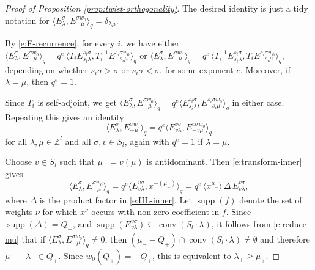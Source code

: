 \documentclass[12pt]{amsart}
\theoremstyle{definition}
\theoremstyle{remark}
\newcommand{\ZZ}{{\mathbb Z}}
\DeclareMathOperator{\conv}{conv}
\DeclareMathOperator{\supp}{supp}
\begin{document}
\begin{proof}[Proof of Proposition \ref{prop:twist-orthogonality}]
The desired identity is just a tidy notation for $\langle E_{\lambda
}^{\sigma },E_{-\mu }^{\sigma w_{0}} \rangle _{q} = \delta _{\lambda
\mu }$.

By \eqref{e:E-recurrence}, for every $i$, we have either $\langle
E_{\lambda }^{\sigma }, E_{-\mu }^{\sigma w_{0}} \rangle _{q} =
q^{e}\, \langle T_{i} E_{s_{i}\lambda }^{s_{i}\sigma },
T_{i}^{-1}E_{-s_{i} \mu }^{s_{i} \sigma w_{0}} \rangle _{q}$ or
$\langle E_{\lambda }^{\sigma }, E_{-\mu }^{\sigma w_{0}} \rangle _{q}
= q^{e}\, \langle T_{i}^{-1} E_{s_{i} \lambda }^{s_{i} \sigma }, T_{i}
E_{- s_{i} \mu }^{s_{i} \sigma w_{0}} \rangle _{q}$, depending on
whether $s_{i}\sigma >\sigma $ or $s_{i}\sigma <\sigma $, for some
exponent $e$.  Moreover, if $\lambda =\mu $, then $q^{e} = 1$.

Since $T_{i}$ is self-adjoint, we get $\langle E_{\lambda }^{\sigma },
E_{-\mu }^{\sigma w_{0}} \rangle _{q} = q^{e} \langle E_{s_{i}\lambda
}^{s_{i}\sigma }, E_{-s_{i} \mu }^{s_{i} \sigma w_{0}} \rangle _{q}$
in either case.  Repeating this gives an identity
\begin{equation}\label{e:transform-inner}
\langle E^{\sigma }_{\lambda }, E^{\sigma w_{0}}_{-\mu } \rangle _{q} =
q^{e} \langle E^{v \sigma }_{v \lambda }, E^{v \sigma w_{0}}_{-v \mu }
\rangle _{q}
\end{equation}
for all $\lambda ,\mu \in \ZZ ^{l}$ and all $\sigma ,v\in S_{l}$,
again with $q^{e} = 1$ if $\lambda =\mu $.

Choose $v\in S_{l}$ such that $\mu _{-} = v (\mu )$ is antidominant.
Then \eqref{e:transform-inner} gives
\begin{equation}\label{e:reduce-mu}
\langle E^{\sigma }_{\lambda }, E^{\sigma w_{0}}_{-\mu } \rangle _{q}
= q^{e} \langle E^{v \sigma }_{v \lambda }, x^{-(\mu _{-})} \rangle
_{q} =q^{e}\, \langle x^{\mu _{-}} \rangle \, \Delta\, E^{v
\sigma }_{v \lambda },
\end{equation}
where $\Delta $ is the product factor
in \eqref{e:HL-inner}.  Let
$\supp (f)$ denote the set of weights $\nu $ for which $x^{\nu }$
occurs with non-zero coefficient in $f$.  Since $\supp (\Delta )
= Q_{+}$, and $\supp (E^{v \sigma }_{v \lambda })\subseteq \conv
(S_{l}\cdot \lambda )$, it follows from \eqref{e:reduce-mu} that if
$\langle E^{\sigma }_{\lambda }, E^{\sigma w_{0}}_{-\mu } \rangle
_{q}\not =0$, then $(\mu _{-}-Q_{+})\cap \conv (S_{l}\cdot \lambda
)\not =\emptyset $ and therefore $\mu _{-} - \lambda _{-}\in
Q_{+}$. Since $w_{0}(Q_{+}) = -Q_{+}$, this is equivalent to $\lambda
_{+}\geq \mu _{+}$.


\end{proof}
\end{document}
